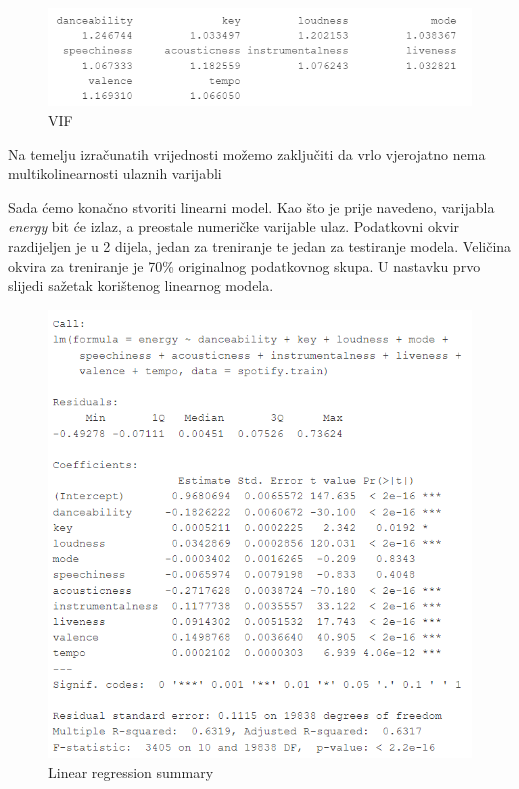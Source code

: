 	\begin{figure}[H]
		\includegraphics[scale=0.9]{slike/vif.png}
		\centering
		\caption{VIF}
		
	\end{figure}
	
	Na temelju izračunatih vrijednosti možemo zaključiti da vrlo vjerojatno nema multikolinearnosti ulaznih varijabli
	
	Sada ćemo konačno stvoriti linearni model. Kao što je prije navedeno, varijabla \textit{energy} bit će izlaz, a preostale numeričke varijable ulaz.
	Podatkovni okvir razdijeljen je u 2 dijela, jedan za treniranje te jedan za testiranje modela. Veličina okvira za treniranje je 70\% originalnog podatkovnog skupa. 
	U nastavku prvo slijedi sažetak korištenog linearnog modela.
	
	\begin{figure}[H]
		\includegraphics[scale=0.9]{slike/linReg.png}
		\centering
		\caption{Linear regression summary}
		
	\end{figure}
	
